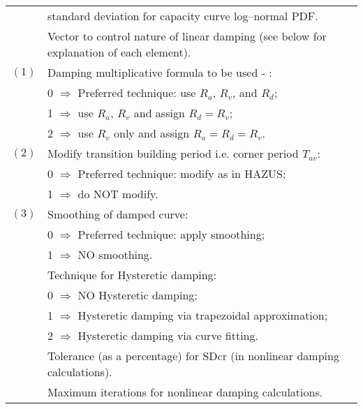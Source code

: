 \begin{supertabular}{lp{0.6\textwidth}}
  & standard deviation for capacity curve log--normal PDF.      \\
  & Vector to control nature of linear damping (see below for explanation of each element). \\
$(1)$ & Damping multiplicative formula to
be
used - : \\
 & \hspace{0.5em} 0 $\Rightarrow$ Preferred technique: use $R_a$, $R_v$, and $R_d$; \\
 & \hspace{0.5em} 1 $\Rightarrow$ use $R_a$, $R_v$ and assign $R_d= R_v$; \\
 & \hspace{0.5em} 2 $\Rightarrow$ use $R_v$ only and assign $R_a=R_d=R_v$. \\
$(2)$ & Modify transition building period i.e. corner period $T_{av}$: \\
 & \hspace{0.5em} 0 $\Rightarrow$ Preferred technique: modify as in HAZUS; \\
 & \hspace{0.5em} 1 $\Rightarrow$ do NOT modify. \\
$(3)$ & Smoothing of damped curve: \\
 & \hspace{0.5em} 0 $\Rightarrow$ Preferred technique: apply smoothing; \\
 & \hspace{0.5em} 1 $\Rightarrow$ NO smoothing.\\
 & Technique for Hysteretic  damping: \\
 & \hspace{0.5em} 0 $\Rightarrow$ NO Hysteretic  damping; \\
 & \hspace{0.5em} 1 $\Rightarrow$ Hysteretic  damping via trapezoidal approximation; \\
 & \hspace{0.5em} 2 $\Rightarrow$ Hysteretic  damping via curve fitting.  \\
    &    Tolerance (as a percentage) for SDcr (in nonlinear damping calculations).   \\
  & Maximum iterations for nonlinear damping calculations.\\
 \end{supertabular}

